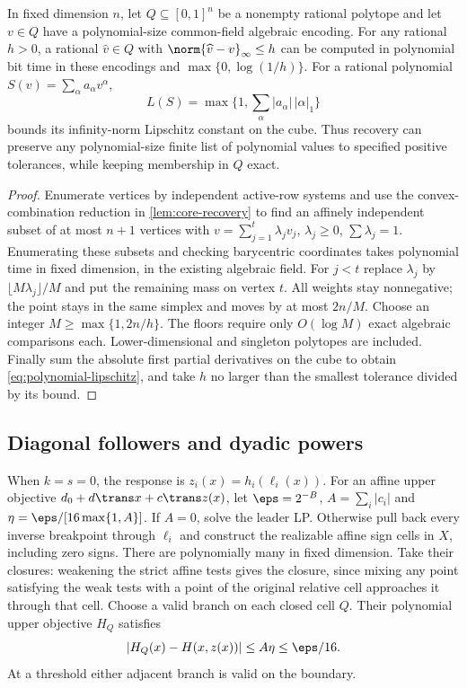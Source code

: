 \begin{lemma}\label{lem:rational-rounding}
In fixed dimension $n$, let $Q\subseteq[0,1]^n$ be a nonempty rational
polytope and let $v\in Q$ have a polynomial-size common-field algebraic
encoding. For any rational $h>0$, a rational $\widehat v\in Q$ with
$\norm{\widehat v-v}_\infty\le h$ can be computed in polynomial bit
time in these encodings and $\max\{0,\log(1/h)\}$.
For a rational polynomial $S(v)=\sum_\alpha a_\alpha v^\alpha$,
\begin{equation}\label{eq:polynomial-lipschitz}
             L(S)=\max\{1,\sum_\alpha |a_\alpha|\,|\alpha|_1\}
\end{equation}
bounds its infinity-norm Lipschitz constant on the cube. Thus recovery
can preserve any polynomial-size finite list of polynomial values to
specified positive tolerances, while keeping membership in $Q$ exact.
\end{lemma}
\begin{proof}
Enumerate vertices by independent active-row systems and use the
convex-combination reduction in \cref{lem:core-recovery} to find an
affinely independent subset of at most $n+1$ vertices with
$v=\sum_{j=1}^t\lambda_jv_j$, $\lambda_j\ge0$, $\sum\lambda_j=1$.
Enumerating these subsets and checking barycentric coordinates takes
polynomial time in fixed dimension, in the existing algebraic field.
For $j<t$ replace $\lambda_j$ by $\lfloor M\lambda_j\rfloor/M$
and put the remaining mass on vertex $t$. All weights stay nonnegative;
the point stays in the same simplex and moves by at most $2n/M$.
Choose an integer $M\ge\max\{1,2n/h\}$. The floors require only
$O(\log M)$ exact algebraic comparisons each. Lower-dimensional and
singleton polytopes are included. Finally sum the absolute first partial
derivatives on the cube to obtain \eqref{eq:polynomial-lipschitz}, and
take $h$ no larger than the smallest tolerance divided by its bound.
\end{proof}

\subsection{Diagonal followers and dyadic powers}\label{subsec:accuracy-diagonal}

When $k=s=0$, the response is $z_i(x)=h_i(\ell_i(x))$.
For an affine upper objective $d_0+d\trans x+c\trans z(x)$, let
$\eps=2^{-B}$, $A=\sum_i|c_i|$ and
$\eta=\eps/[16\max\{1,A\}]$. If $A=0$, solve the leader LP.
Otherwise pull back every inverse breakpoint through $\ell_i$ and
construct the realizable affine sign cells in $X$, including zero signs.
There are polynomially many in fixed dimension. Take their closures:
weakening the strict affine tests gives the closure, since mixing any
point satisfying the weak tests with a point of the original relative
cell approaches it through that cell. Choose a valid branch on each
closed cell $Q$. Their polynomial upper objective $H_Q$ satisfies
\begin{equation}\label{eq:diagonal-uniform-error}
                     |H_Q(x)-H(x,z(x))|\le A\eta\le\eps/16.
\end{equation}
At a threshold either adjacent branch is valid on the boundary.

